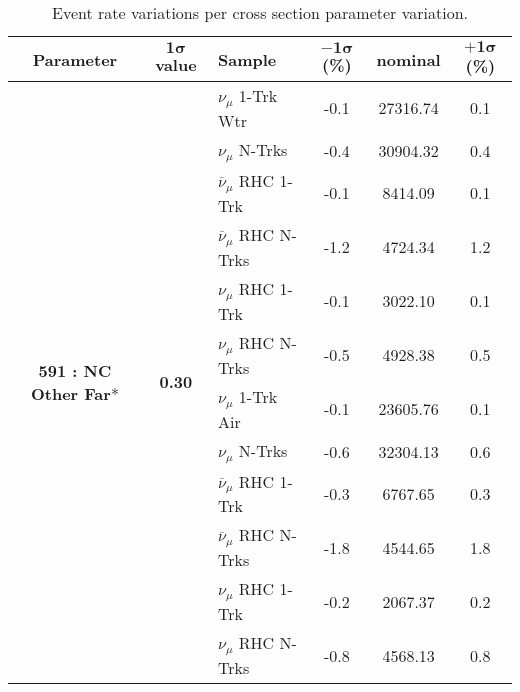 \begin{table}[ht!]
\centering
\begin{tabular}{ c  c  l  c  c  c }
\midrule[1.3pt]
\textbf{Parameter} & \textbf{$\mathbf{1\sigma}$ value} & \textbf{Sample} & \textbf{$\mathbf{-1\sigma}$ (\%)}  &  \textbf{nominal}  &  \textbf{$\mathbf{+1\sigma}$ (\%)} \\
\midrule[1.3pt]
\multirow{12}{*}{\textbf{591 : NC Other Far}*} & \multirow{12}{*}{\textbf{0.30}} & $\nu_\mu$ 1-Trk Wtr &   -0.1 &  27316.74 &   0.1 \\ 
 &  & $\nu_\mu$ N-Trks &   -0.4 &  30904.32 &   0.4 \\ 
 &  & $\overline{\nu}_\mu$ RHC 1-Trk &   -0.1 &  8414.09 &   0.1 \\ 
 &  & $\overline{\nu}_\mu$ RHC N-Trks &   -1.2 &  4724.34 &   1.2 \\ 
 &  & $\nu_\mu$ RHC 1-Trk &   -0.1 &  3022.10 &   0.1 \\ 
 &  & $\nu_\mu$ RHC N-Trks &   -0.5 &  4928.38 &   0.5 \\ 
 &  & $\nu_\mu$ 1-Trk Air &   -0.1 &  23605.76 &   0.1 \\ 
 &  & $\nu_\mu$ N-Trks &   -0.6 &  32304.13 &   0.6 \\ 
 &  & $\overline{\nu}_\mu$ RHC 1-Trk &   -0.3 &  6767.65 &   0.3 \\ 
 &  & $\overline{\nu}_\mu$ RHC N-Trks &   -1.8 &  4544.65 &   1.8 \\ 
 &  & $\nu_\mu$ RHC 1-Trk &   -0.2 &  2067.37 &   0.2 \\ 
 &  & $\nu_\mu$ RHC N-Trks &   -0.8 &  4568.13 &   0.8 \\ 
\midrule[1.3pt]
\end{tabular}
\centering
\caption*{Event rate variations per cross section parameter variation.}
\end{table}
\addtocounter{table}{-1}
